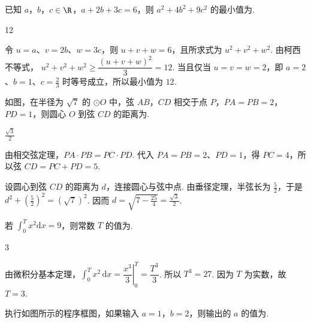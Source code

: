 \begin{problem}
已知 \(a\)，\(b\)，\(c \in \R\)，\(a + 2b + 3c = 6\)，则 \(a^2 + 4b^2 + 9c^2\) 的最小值为\fillinblank{}.
\end{problem}

\begin{answer}
12
\end{answer}

\begin{solution}
令 \(u=a\)、\(v=2b\)、\(w=3c\)，则 \(u+v+w=6\)，且所求式为 \(u^{2}+v^{2}+w^{2}\). 由柯西不等式，
\(u^{2}+v^{2}+w^{2}\geqslant\dfrac{(u+v+w)^{2}}{3}=12\).
当且仅当 \(u=v=w=2\)，即 \(a=2\)、\(b=1\)、\(c=\frac{2}{3}\) 时等号成立，所以最小值为 \(12\).
\end{solution}

\begin{problem}
如图，在半径为 \(\sqrt{7}\) 的 \(\odot O\) 中，弦 \(AB\)，\(CD\) 相交于点 \(P\)，\(PA = PB = 2\)，\(PD = 1\)，则圆心 \(O\) 到弦 \(CD\) 的距离为\fillinblank{}.
\end{problem}

\begin{answer}
\(\frac{\sqrt{3}}{2}\)
\end{answer}

\begin{solution}
由相交弦定理，\(PA\cdot PB=PC\cdot PD\). 代入 \(PA=PB=2\)、\(PD=1\)，得 \(PC=4\)，所以弦 \(CD=PC+PD=5\).

设圆心到弦 \(CD\) 的距离为 \(d\)，连接圆心与弦中点. 由垂径定理，半弦长为 \(\frac{5}{2}\)，于是
\(d^{2}+\left(\frac{5}{2}\right)^{2}=(\sqrt{7})^{2}\). 因而 \(d=\sqrt{7-\frac{25}{4}}=\frac{\sqrt{3}}{2}\).
\end{solution}

\begin{problem}
若 \(\int_{0}^{T} x^{2} \mathrm{d}x = 9\)，则常数 \(T\) 的值为\fillinblank{}.
\end{problem}

\begin{answer}
3
\end{answer}

\begin{solution}
由微积分基本定理，\(\int_{0}^{T}x^{2}\,\mathrm{d}x=\left.\dfrac{x^{3}}{3}\right|_{0}^{T}=\dfrac{T^{3}}{3}\). 所以 \(T^{3}=27\). 因为 \(T\) 为实数，故 \(T=3\).
\end{solution}

\begin{problem}
执行如图所示的程序框图，如果输入 \(a = 1\)，\(b = 2\)，则输出的 \(a\) 的值为\fillinblank{}.
\end{problem}

